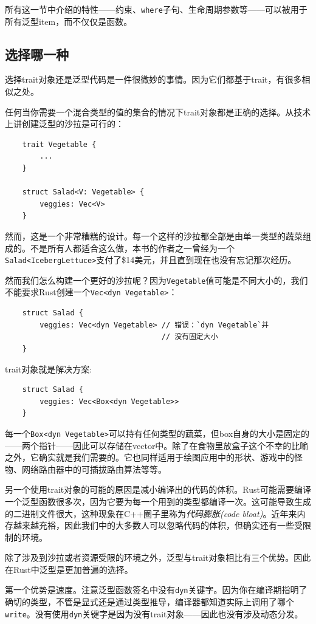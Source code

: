 所有这一节中介绍的特性——约束、\texttt{where}子句、生命周期参数等——可以被用于所有泛型item，而不仅仅是函数。

\subsection{选择哪一种}\label{WhichToUse}
选择trait对象还是泛型代码是一件很微妙的事情。因为它们都基于trait，有很多相似之处。

任何当你需要一个混合类型的值的集合的情况下trait对象都是正确的选择。从技术上讲创建泛型的沙拉是可行的：
\begin{verbatim}
    trait Vegetable {
        ...
    }

    struct Salad<V: Vegetable> {
        veggies: Vec<V>
    }
\end{verbatim}

然而，这是一个非常糟糕的设计。每一个这样的沙拉都全部是由单一类型的蔬菜组成的。不是所有人都适合这么做，本书的作者之一曾经为一个\texttt{Salad<IcebergLettuce>}支付了\$14美元，并且直到现在也没有忘记那次经历。

然而我们怎么构建一个更好的沙拉呢？因为\texttt{Vegetable}值可能是不同大小的，我们不能要求Rust创建一个\texttt{Vec<dyn Vegetable>}：
\begin{verbatim}
    struct Salad {
        veggies: Vec<dyn Vegetable> // 错误：`dyn Vegetable`并
                                    // 没有固定大小
    }
\end{verbatim}

trait对象就是解决方案:
\begin{verbatim}
    struct Salad {
        veggies: Vec<Box<dyn Vegetable>>
    }
\end{verbatim}

每一个\texttt{Box<dyn Vegetable>}可以持有任何类型的蔬菜，但box自身的大小是固定的——两个指针——因此可以存储在vector中。除了在食物里放盒子这个不幸的比喻之外，它确实就是我们需要的。它也同样适用于绘图应用中的形状、游戏中的怪物、网络路由器中的可插拔路由算法等等。

另一个使用trait对象的可能的原因是减小编译出的代码的体积。Rust可能需要编译一个泛型函数很多次，因为它要为每一个用到的类型都编译一次。这可能导致生成的二进制文件很大，这种现象在C++圈子里称为\emph{代码膨胀(code bloat)}。近年来内存越来越充裕，因此我们中的大多数人可以忽略代码的体积，但确实还有一些受限制的环境。

除了涉及到沙拉或者资源受限的环境之外，泛型与trait对象相比有三个优势。因此在Rust中泛型是更加普遍的选择。

第一个优势是速度。注意泛型函数签名中没有\texttt{dyn}关键字。因为你在编译期指明了确切的类型，不管是显式还是通过类型推导，编译器都知道实际上调用了哪个\texttt{write}。没有使用\texttt{dyn}关键字是因为没有trait对象——因此也没有涉及动态分发。

